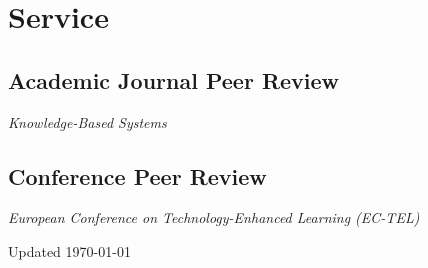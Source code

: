 \documentclass[11pt,letterpaper]{report}
\newcommand{\listitemspace}{0.25em}
\renewenvironment{itemize}
{\begin{list}{}{\setlength{\leftmargin}{0em}
                \setlength{\parskip}{0em}
                \setlength{\itemsep}{\listitemspace}
                \setlength{\parsep}{\listitemspace}}}
{\end{list}}
\begin{document}
    \section*{Service}

    \subsection*{Academic Journal Peer Review}

    \begin{itemize}
        \item \textit{Knowledge-Based Systems}
    \end{itemize}

    \subsection*{Conference Peer Review}

    \begin{itemize}
        \item \textit{European Conference on Technology-Enhanced Learning (EC-TEL)}
    \end{itemize}

    \begin{center}
        \vfill
        Updated \monthyeardate\today
    \end{center}
\end{document}
